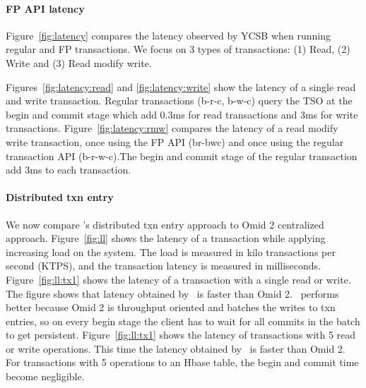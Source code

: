 \paragraph{FP API latency}
Figure~\ref{fig:latency} compares the latency observed by YCSB when running regular and FP transactions.
We focus on 3 types of transactions: (1) Read, (2) Write and (3) Read modify write.

Figures~\ref{fig:latency:read} and \ref{fig:latency:write} show the latency of a single read and write transaction. Regular transactions (b-r-c, b-w-c) query the TSO at the begin and commit stage which add 0.3ms for read transactions and 3ms for write transactions.
Figure~\ref{fig:latency:rmw} compares the latency of a read modify write transaction, once using the FP API (br-bwc) and once using the regular transaction API (b-r-w-c).The begin and commit stage of the regular transaction add 3ms to each transaction.

\paragraph{Distributed txn entry}
We now compare \sys's distributed txn entry approach to Omid 2 centralized approach. Figure~\ref{fig:ll} shows the latency of a transaction while applying increasing load on the system. The load is measured in kilo transactions per second (KTPS), and the transaction latency is measured in milliseconds. Figure~\ref{fig:ll:tx1} shows the latency of a transaction with a single read or write. The figure shows that latency obtained by \sys\ is  faster than Omid 2. \sys\ performs better because Omid 2 is throughput oriented and batches the writes to txn entries, so on every begin stage the client has to wait for all commits in the batch to get persistent.
Figure~\ref{fig:ll:tx1} shows the latency of transactions with 5 read or write operations. This time the latency obtained by \sys\ is  faster than Omid 2. For transactions with 5 operations to an Hbase table, the begin and commit time become negligible.






